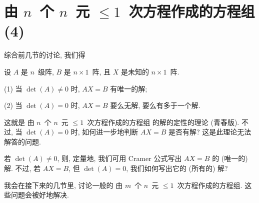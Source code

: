 \documentclass[../libro.tex]{subfiles}
\begin{document}
\KunAsteriskoEnEnhavtabelo
\section{\texorpdfstring{由 \(n\)~个 \(n\)~元
    \({\leq} 1\)~次方程作成的方程组 (4)}%
{由 n 个 n 元 ≤1 次方程作成的方程组 (4)}}
\SenAsteriskoEnEnhavtabelo

\maldevigalegajxo

综合前几节的讨论, 我们得

\begin{theorem}
    设 \(A\) 是 \(n\)~级阵,
    \(B\) 是 \(n \times 1\)~阵,
    且 \(X\) 是未知的 \(n \times 1\)~阵.

    (1)
    当 \(\det {(A)} \neq 0\) 时,
    \(AX = B\) 有唯一的解;

    (2)
    当 \(\det {(A)} = 0\) 时,
    \(AX = B\) 要么无解,
    要么有多于一个解.
\end{theorem}

这就是%
由 \(n\)~个 \(n\)~元 \({\leq} 1\)~次方程作成的方程组%
的解的定性的理论 (青春版).
不过,
当 \(\det {(A)} = 0\) 时,
如何进一步地判断 \(AX = B\) 是否有解?
这是此理论无法解答的问题.

若 \(\det {(A)} \neq 0\),
则, 定量地,
我们可用 Cramer 公式写出
\(AX = B\) 的 (唯一的) 解.
不过, 若 \(AX = B\),
但 \(\det {(A)} = 0\),
我们如何写出它的 (所有的) 解?

我会在接下来的几节里,
讨论一般的%
由 \(m\)~个 \(n\)~元 \({\leq} 1\)~次方程作成的方程组.
这些问题会被好地解决.
\end{document}
